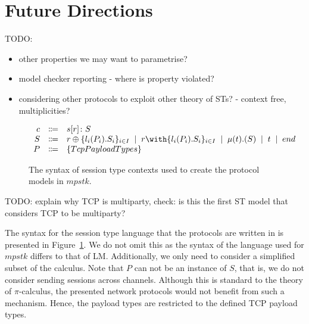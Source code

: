 \documentclass{article}
\newcommand{\todo}[1]{}
\renewcommand{\todo}[1]{{\color{red} TODO: {#1}}}
\newcommand{\sep}{\;\mid\;}
\begin{document}
\section{Future Directions}

\todo{
    \begin{itemize}
        \item other properties we may want to parametrise?
        \item model checker reporting - where is property violated?
        \item considering other protocols to exploit other theory of STs? - context free, multiplicities?
    \end{itemize}
}


\begin{figure}[H]
    \centering
        $
        \begin{array}{rcl}
        \ensuremath{c}
            & \Coloneqq & \ensuremath{s[r] \colon S} \cr
        \ensuremath{S}
            & \Coloneqq & \ensuremath{r \oplus \{l_i(P_i).S_i\}_{i \in I}}
            \sep        \ensuremath{r \with \{l_i(P_i).S_i\}_{i \in I}}
            \sep        \ensuremath{\mu(t).(S)}
            \sep        \ensuremath{t}
            \sep        \ensuremath{end} \cr
        \ensuremath{P}
            & \Coloneqq & \ensuremath{\{TcpPayloadTypes\}}
        \end{array}
        $
    \caption{The syntax of session type contexts used to create the protocol models in \ensuremath{mpstk}.}
    \label{fig:syntax}
\end{figure}

\todo{explain why TCP is multiparty, check: is this the first ST model that considers TCP to be multiparty?}

The syntax for the session type language that the protocols are written in is presented in Figure~\ref{fig:syntax}.
We do not omit this as the syntax of the language used for \ensuremath{mpstk} differs to that of LM.
Additionally, we only need to consider a simplified subset of the calculus.
Note that \ensuremath{P} can not be an instance of \ensuremath{S}, that is, we do not consider sending sessions across channels.
Although this is standard to the theory of \ensuremath{\pi}-calculus, the presented network protocols would not benefit from such a mechanism.
Hence, the payload types are restricted to the defined TCP payload types.

\medskip
\nocite{*}
\printbibliography
\end{document}
